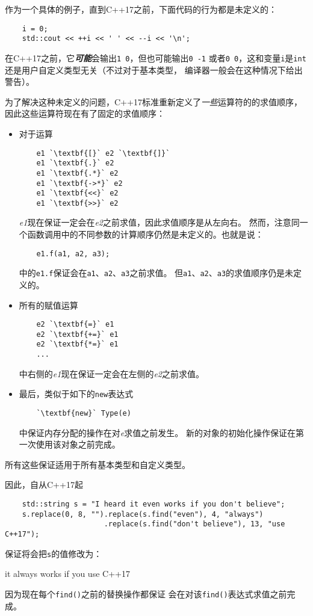 作为一个具体的例子，直到C++17之前，下面代码的行为都是未定义的：
\begin{lstlisting}
    i = 0;
    std::cout << ++i << ' ' << --i << '\n';
\end{lstlisting}
在C++17之前，它\emph{\textbf{可能}}会输出\texttt{1 0}，但也可能输出\texttt{0 -1}
或者\texttt{0 0}，这和变量\texttt{i}是\texttt{int}还是用户自定义类型无关（不过对于基本类型，
编译器一般会在这种情况下给出警告）。

为了解决这种未定义的问题，C++17标准重新定义了\emph{一些}运算符的的求值顺序，
因此这些运算符现在有了固定的求值顺序：
\begin{itemize}
    \item 对于运算
    \begin{lstlisting}
    e1 `\textbf{[}` e2 `\textbf{]}`
    e1 `\textbf{.}` e2
    e1 `\textbf{.*}` e2
    e1 `\textbf{->*}` e2
    e1 `\textbf{<<}` e2
    e1 `\textbf{>>}` e2
    \end{lstlisting}
    \emph{e1}现在保证一定会在\emph{e2}之前求值，因此求值顺序是从左向右。
    然而，注意同一个函数调用中的不同参数的计算顺序仍然是未定义的。也就是说：
    \begin{lstlisting}
    e1.f(a1, a2, a3);
    \end{lstlisting}
    中的\texttt{e1.f}保证会在\texttt{a1}、\texttt{a2}、\texttt{a3}之前求值。
    但\texttt{a1}、\texttt{a2}、\texttt{a3}的求值顺序仍是未定义的。
    \item 所有的赋值运算
    \begin{lstlisting}
    e2 `\textbf{=}` e1
    e2 `\textbf{+=}` e1
    e2 `\textbf{*=}` e1
    ...
    \end{lstlisting}
    中右侧的\emph{e1}现在保证一定会在左侧的\emph{e2}之前求值。
    \item 最后，类似于如下的\texttt{new}表达式
    \begin{lstlisting}
    `\textbf{new}` Type(e)
    \end{lstlisting}
    中保证内存分配的操作在对\emph{e}求值之前发生。
    新的对象的初始化操作保证在第一次使用该对象之前完成。
\end{itemize}
所有这些保证适用于所有基本类型和自定义类型。

因此，自从C++17起
\begin{lstlisting}
    std::string s = "I heard it even works if you don't believe";
    s.replace(0, 8, "").replace(s.find("even"), 4, "always")
                       .replace(s.find("don't believe"), 13, "use C++17");
\end{lstlisting}
保证将会把\texttt{s}的值修改为：
\begin{blacklisting}
    it always works if you use C++17
\end{blacklisting}
因为现在每个\texttt{find()}之前的替换操作都保证
会在对该\texttt{find()}表达式求值之前完成。

